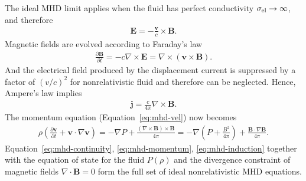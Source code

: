 The ideal MHD limit applies when the fluid has perfect conductivity $\sigma_{\rm el}\rightarrow\infty$, and therefore 
\begin{eqnarray}\label{eq:mhd-vanshing-e}
	\boldsymbol{E}=-\frac{\boldsymbol{v}}{c}\times\boldsymbol{B}.
\end{eqnarray}
Magnetic fields are evolved according to Faraday's law
\begin{eqnarray}\label{eq:mhd-induction}
	\frac{\partial \boldsymbol{B}}{\partial t} = -c\nabla\times\boldsymbol{E} = \nabla\times(\boldsymbol{v}\times\boldsymbol{B}).
\end{eqnarray}
And the electrical field produced by the displacement current  is suppressed by a factor of $(v/c)^2$ for nonrelativistic fluid and therefore can be neglected.
Hence, Ampere's law implies
\begin{eqnarray}
	\boldsymbol{j}=\frac{c}{4\pi}\nabla\times \boldsymbol{B}.
\end{eqnarray}
The momentum equation (Equation~\ref{eq:mhd-vel}) now becomes
\begin{eqnarray}\label{eq:mhd-momentum}
	\rho \left(\frac{\partial \boldsymbol{v}}{\partial t} + \boldsymbol{v}\cdot \nabla \boldsymbol{v}\right) = -\nabla P + \frac{(\nabla\times \boldsymbol{B})\times\boldsymbol{B}}{4\pi} = -\nabla\left( P + \frac{B^2}{4\pi} \right) + \frac{\boldsymbol{B}\cdot\nabla\boldsymbol{B}}{4\pi}.
\end{eqnarray}
Equation~\ref{eq:mhd-continuity}, \ref{eq:mhd-momentum}, \ref{eq:mhd-induction} together with the equation of state for the fluid $P(\rho)$ and the divergence constraint of magnetic fields $\nabla\cdot\boldsymbol{B}=0$ form the full set of ideal nonrelativistic MHD equations.

